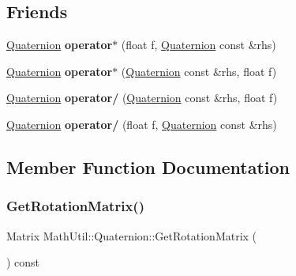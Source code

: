 \subsection*{Friends}
\begin{DoxyCompactItemize}
\item 
\mbox{\label{structMathUtil_1_1Quaternion_a047591b16ace29c20014c06c1e3f56ee}} 
\hyperlink{structMathUtil_1_1Quaternion}{Quaternion} {\bfseries operator$\ast$} (float f, \hyperlink{structMathUtil_1_1Quaternion}{Quaternion} const \&rhs)
\item 
\mbox{\label{structMathUtil_1_1Quaternion_aecdc0f848a93cfe34ca8ca7b31024e27}} 
\hyperlink{structMathUtil_1_1Quaternion}{Quaternion} {\bfseries operator$\ast$} (\hyperlink{structMathUtil_1_1Quaternion}{Quaternion} const \&rhs, float f)
\item 
\mbox{\label{structMathUtil_1_1Quaternion_af69cd135c1f4ef58d6dd242617108195}} 
\hyperlink{structMathUtil_1_1Quaternion}{Quaternion} {\bfseries operator/} (\hyperlink{structMathUtil_1_1Quaternion}{Quaternion} const \&rhs, float f)
\item 
\mbox{\label{structMathUtil_1_1Quaternion_a241417eeb3a5c9d24697776ff3ba3dfc}} 
\hyperlink{structMathUtil_1_1Quaternion}{Quaternion} {\bfseries operator/} (float f, \hyperlink{structMathUtil_1_1Quaternion}{Quaternion} const \&rhs)
\end{DoxyCompactItemize}


\subsection{Member Function Documentation}
\mbox{\label{structMathUtil_1_1Quaternion_a331cf32ec3767d734e0ad0ebc9e3cccb}} 
\subsubsection{\texorpdfstring{Get\+Rotation\+Matrix()}{GetRotationMatrix()}}
{\footnotesize\ttfamily Matrix Math\+Util\+::\+Quaternion\+::\+Get\+Rotation\+Matrix (\begin{DoxyParamCaption}{ }\end{DoxyParamCaption}) const\hspace{0.3cm}{\ttfamily [inline]}}


